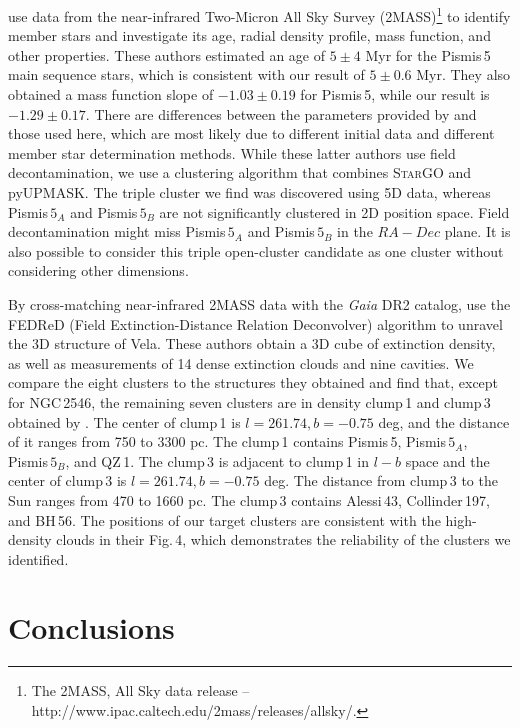 \documentclass{aa} %
\begin{document}
\citet{2009MNRAS.397.1915B} use data from the near-infrared Two-Micron All Sky Survey
(2MASS)\footnote{The 2MASS, All Sky data release \citep{2006AJ....131.1163S} –http://www.ipac.caltech.edu/2mass/releases/allsky/.} 
to identify member stars and investigate its age, radial density profile, mass function, and other properties. These authors estimated an age of $5\pm 4$ Myr for the Pismis\,5 main sequence stars, which is consistent with our result of $5\pm 0.6$ Myr. They also obtained a mass function slope of $-1.03\pm 0.19$ for Pismis\,5, while our result is $-1.29\pm 0.17$.
There are differences between the parameters provided by \citet{2009MNRAS.397.1915B} and those used here, which are most likely due to 
different initial data and different member star determination methods. 
While these latter authors use field decontamination, we use a clustering algorithm that combines 
\textsc{StarGO} and pyUPMASK. The triple cluster we find was discovered using 
5D data, whereas Pismis$\,5_{A}$ and Pismis$\,5_{B}$ are not significantly clustered in 2D position 
space. Field decontamination might miss Pismis$\,5_{A}$ and Pismis$\,5_{B}$ in the $RA-Dec$ plane. It is also 
possible to consider this triple open-cluster candidate as one cluster without considering other dimensions.


By cross-matching near-infrared 2MASS data with the {\it Gaia} DR2 catalog, 
\citet{2021A&A...655A..68H} use the FEDReD (Field Extinction-Distance 
Relation Deconvolver) algorithm to unravel the 3D structure of Vela. These authors obtain a 3D cube of extinction density, as well as measurements of 14 dense extinction clouds and nine cavities. 
We compare the eight clusters to the structures they obtained and find that, 
except for NGC\,2546, the remaining seven clusters are  
in density clump\,1 and clump\,3 obtained by \citet{2021A&A...655A..68H}. The center of clump\,1 is $l=261.74, b=-0.75$ deg, and the distance of it ranges from 750 to 3300 pc. The clump\,1 contains Pismis\,5, Pismis$\,5_{A}$, Pismis$\,5_{B}$, and QZ\,1. The clump\,3 is adjacent to clump\,1 in $l-b$ space and the center of clump\,3 is $l=261.74, b=-0.75$ deg. The distance from clump\,3 to the Sun ranges from 470 to 1660 pc. The clump\,3 contains Alessi\,43, Collinder\,197, and BH\,56.
The positions of our target clusters are consistent with the high-density clouds in their Fig.\,4, which demonstrates the reliability of the clusters we identified.


\section{Conclusions}\label{sec:sum}
\end{document}
